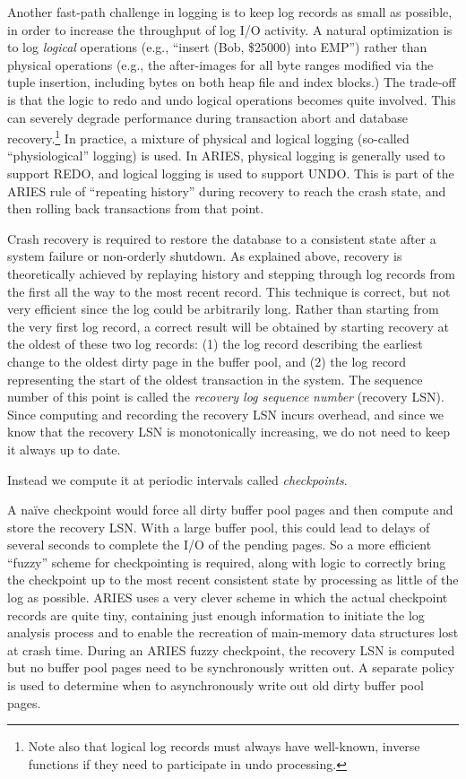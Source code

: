 \documentclass[a4paper,11pt,twoside,openright]{book}
\begin{document}
Another fast-path challenge in logging is to keep log records as small
as possible, in order to increase the throughput of log I/O activity. A
natural optimization is to log \emph{logical} operations (e.g., ``insert
(Bob, \$25000) into EMP'') rather than physical operations (e.g., the
after-images for all byte ranges modified via the tuple insertion,
including bytes on both heap file and index blocks.) The trade-off is
that the logic to redo and undo logical operations becomes quite
involved. This can severely degrade performance during transaction abort
and database recovery.\footnote{Note also that logical log records must always have well-known,
inverse functions if they need to participate in undo processing.} In practice, a mixture of
physical and logical logging (so-called ``physiological'' logging) is
used. In ARIES, physical logging is generally used to support REDO, and
logical logging is used to support UNDO. This is part of the ARIES rule
of ``repeating history'' during recovery to reach the crash state, and
then rolling back transactions from that point.

Crash recovery is required to restore the database to a consistent state
after a system failure or non-orderly shutdown. As explained above,
recovery is theoretically achieved by replaying history and stepping
through log records from the first all the way to the most recent
record. This technique is correct, but not very efficient since the log
could be arbitrarily long. Rather than starting from the very first log
record, a correct result will be obtained by starting recovery at the
oldest of these two log records: (1) the log record describing the
earliest change to the oldest dirty page in the buffer pool, and (2) the
log record representing the start of the oldest transaction in the
system. The sequence number of this point is called the \emph{recovery
log sequence} \emph{number} (recovery LSN). Since computing and
recording the recovery LSN incurs overhead, and since we know that the
recovery LSN is
monotonically increasing, we do not need to keep it always up to date.

Instead we compute it at periodic intervals called \emph{checkpoints}.

A na\"ive checkpoint would force all dirty buffer pool pages and then
compute and store the recovery LSN. With a large buffer pool, this could
lead to delays of several seconds to complete the I/O of the pending
pages. So a more efficient ``fuzzy'' scheme for checkpointing is
required, along with logic to correctly bring the checkpoint up to the
most recent consistent state by processing as little of the log as
possible. ARIES uses a very clever scheme in which the actual checkpoint
records are quite tiny, containing just enough information to initiate
the log analysis process and to enable the recreation of main-memory
data structures lost at crash time. During an ARIES fuzzy checkpoint,
the recovery LSN is computed but no buffer pool pages need to be
synchronously written out. A separate policy is used to determine when
to asynchronously write out old dirty buffer pool pages.
\end{document}
